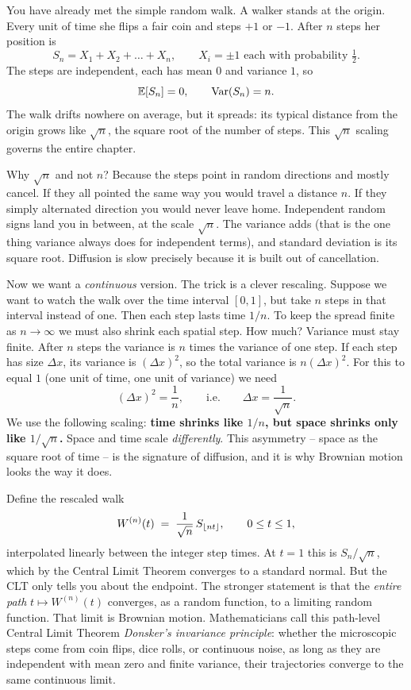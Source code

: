 You have already met the simple random walk. A walker stands at the origin. Every
unit of time she flips a fair coin and steps $+1$ or $-1$. After $n$ steps her
position is
\[
  S_n = X_1 + X_2 + \dots + X_n,
  \qquad X_i = \pm 1 \text{ each with probability } \tfrac12.
\]
The steps are independent, each has mean $0$ and variance $1$, so
\[
  \operatorname{\mathbb{E}}[S_n] = 0, \qquad \operatorname{Var}(S_n) = n.
\]
The walk drifts nowhere on average, but it spreads: its typical distance from the
origin grows like $\sqrt{n}$, the square root of the number of steps. This
$\sqrt{n}$ scaling governs the entire chapter.

\begin{intuitionbox}
Why $\sqrt n$ and not $n$? Because the steps point in random directions and
mostly cancel. If they all pointed the same way you would travel a distance $n$.
If they simply alternated direction you would never leave home. Independent
random signs land you in between, at the scale $\sqrt n$. The variance adds (that
is the one thing variance always does for independent terms), and standard
deviation is its square root. Diffusion is slow precisely because it is built out
of cancellation.
\end{intuitionbox}

Now we want a \emph{continuous} version. The trick is a clever rescaling. Suppose
we want to watch the walk over the time interval $[0,1]$, but take $n$ steps in
that interval instead of one. Then each step lasts time $1/n$. To keep the spread
finite as $n\to\infty$ we must also shrink each spatial step. How much? Variance
must stay finite. After $n$ steps the variance is $n$ times the variance of one
step. If each step has size $\Delta x$, its variance is $(\Delta x)^2$, so the
total variance is $n(\Delta x)^2$. For this to equal $1$ (one unit of time, one
unit of variance) we need
\[
  (\Delta x)^2 = \frac1n,
  \qquad\text{i.e.}\qquad \Delta x = \frac{1}{\sqrt n}.
\]
We use the following scaling: \textbf{time shrinks like
$1/n$, but space shrinks only like $1/\sqrt n$.} Space and time scale
\emph{differently}. This asymmetry -- space as the square root of time -- is the
signature of diffusion, and it is why Brownian motion looks the way it does.

Define the rescaled walk
\[
  W^{(n)}(t) \;=\; \frac{1}{\sqrt n}\, S_{\lfloor nt\rfloor},
  \qquad 0 \le t \le 1,
\]
interpolated linearly between the integer step times. At $t=1$ this is
$S_n/\sqrt n$, which by the Central Limit Theorem converges to a standard normal.
But the CLT only tells you about the endpoint. The stronger statement is that the
\emph{entire path} $t\mapsto W^{(n)}(t)$ converges, as a random function, to a
limiting random function. That limit is Brownian motion. Mathematicians call this
path-level Central Limit Theorem \emph{Donsker's invariance principle}: whether
the microscopic steps come from coin flips, dice rolls, or continuous noise, as
long as they are independent with mean zero and finite variance, their trajectories
converge to the same continuous limit.

